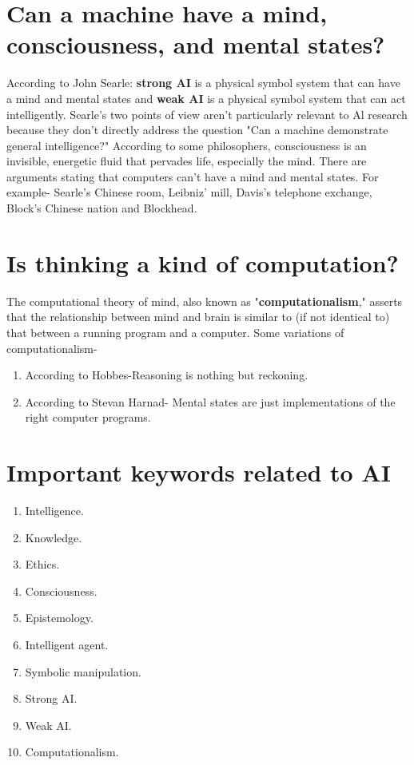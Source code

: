 \documentclass{article}
\begin{document}
\section{Can a machine have a mind, consciousness, and mental states?}
According to John Searle: \textbf{strong AI} is a physical symbol system that can have a mind and mental states and \textbf{weak AI} is a physical symbol system that can act intelligently. Searle's two points of view aren't particularly relevant to Al research because they don't directly address the question "Can a machine demonstrate general intelligence?" According to some philosophers, consciousness is an invisible, energetic fluid that pervades life, especially the mind.
There are arguments stating that computers can't have a mind and mental states. For example- Searle's Chinese room, Leibniz' mill, Davis's telephone exchange, Block's Chinese nation and Blockhead.
\section{Is thinking a kind of computation?}
The computational theory of mind, also known as "\textbf{computationalism}," asserts that the relationship between mind and brain is similar to (if not identical to) that between a running program  and a computer.
Some variations of computationalism-
\begin{enumerate}
\item According to Hobbes-Reasoning is nothing but reckoning.
\item According to Stevan Harnad- Mental states are just implementations of the right computer programs.
\end{enumerate}
\section{Important keywords related to AI}
\begin{enumerate}
\item Intelligence.
\item Knowledge.
\item Ethics.
\item Consciousness.
\item Epistemology.
\item Intelligent agent.
\item Symbolic manipulation.
\item Strong AI.
\item Weak AI.
\item Computationalism. 
\end{enumerate}
\end{document}
